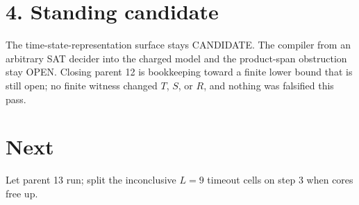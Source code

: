 \documentclass[11pt]{article}
\begin{document}
\section*{4. Standing candidate}
The time-state-representation surface stays CANDIDATE. The compiler from an arbitrary SAT decider into the charged model and the product-span obstruction stay OPEN. Closing parent 12 is bookkeeping toward a finite lower bound that is still open; no finite witness changed $T$, $S$, or $R$, and nothing was falsified this pass.

\section*{Next}
Let parent 13 run; split the inconclusive $L=9$ timeout cells on step 3 when cores free up.
\end{document}
